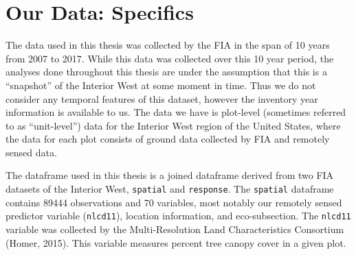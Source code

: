 \documentclass[12pt,twoside]{reedthesis}
\begin{document}
\hypertarget{our-data-specifics}{%
\section{Our Data: Specifics}\label{our-data-specifics}}

The data used in this thesis was collected by the FIA in the span of 10 years from 2007 to 2017. While this data was collected over this 10 year period, the analyses done throughout this thesis are under the assumption that this is a ``snapshot'' of the Interior West at some moment in time. Thus we do not consider any temporal features of this dataset, however the inventory year information is available to us. The data we have is plot-level (sometimes referred to as ``unit-level'') data for the Interior West region of the United States, where the data for each plot consists of ground data collected by FIA and remotely sensed data.

The dataframe used in this thesis is a joined dataframe derived from two FIA datasets of the Interior West, \texttt{spatial} and \texttt{response}. The \texttt{spatial} dataframe contains 89444 observations and 70 variables, most notably our remotely sensed predictor variable (\texttt{nlcd11}), location information, and eco-subsection. The \texttt{nlcd11} variable was collected by the Multi-Resolution Land Characteristics Consortium (Homer, 2015). This variable measures percent tree canopy cover in a given plot.
\end{document}
